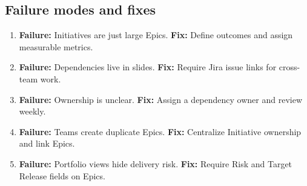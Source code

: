 \subsection{Failure modes and fixes}
\begin{enumerate}
  \item \textbf{Failure:} Initiatives are just large Epics. \textbf{Fix:} Define outcomes and assign measurable metrics.
  \item \textbf{Failure:} Dependencies live in slides. \textbf{Fix:} Require Jira issue links for cross-team work.
  \item \textbf{Failure:} Ownership is unclear. \textbf{Fix:} Assign a dependency owner and review weekly.
  \item \textbf{Failure:} Teams create duplicate Epics. \textbf{Fix:} Centralize Initiative ownership and link Epics.
  \item \textbf{Failure:} Portfolio views hide delivery risk. \textbf{Fix:} Require Risk and Target Release fields on Epics.
\end{enumerate}










